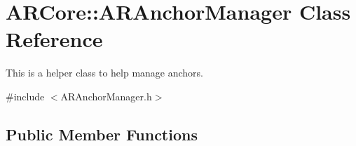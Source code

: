 \hypertarget{class_a_r_core_1_1_a_r_anchor_manager}{}\section{A\+R\+Core\+:\+:A\+R\+Anchor\+Manager Class Reference}
\label{class_a_r_core_1_1_a_r_anchor_manager}


This is a helper class to help manage anchors.  




{\ttfamily \#include $<$A\+R\+Anchor\+Manager.\+h$>$}

\subsection*{Public Member Functions}
